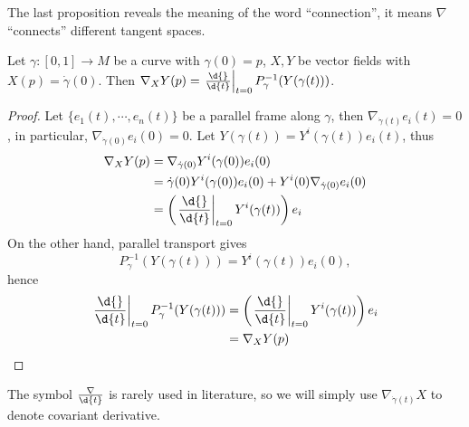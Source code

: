 The last proposition reveals the meaning of the word ``connection'', it means $\nabla$ ``connects'' different tangent spaces.
\begin{prop}
    Let $\gamma:[0,1]\to M$ be a curve with $\gamma(0)=p$, $X,Y$ be vector fields with $X(p)=\dot{\gamma}(0)$.
    Then $\nabla_XY(p)=\left.\frac{\d{}}{\d{t}}\right|_{t=0}P^{-1}_\gamma(Y(\gamma(t)))$.
\end{prop}
\begin{proof}
    Let $\{e_1(t),\cdots,e_n(t)\}$ be a parallel frame along $\gamma$, then $\nabla_{\dot{\gamma}(t)}e_i(t)=0$, in particular, $\nabla_{\dot{\gamma}(0)}e_i(0)=0$.
    Let $Y(\gamma(t))=Y^i(\gamma(t))e_i(t)$, thus
    \begin{align*}
        \nabla_XY(p)&=\nabla_{\dot{\gamma}(0)}Y^i(\gamma(0))e_i(0)\\
        &=\dot{\gamma}(0)Y^i(\gamma(0))e_i(0)+Y^i(0)\nabla_{\dot{\gamma}(0)}e_i(0)\\
        &=\left(\left.\frac{\d{}}{\d{t}}\right|_{t=0}Y^i(\gamma(t))\right)e_i
    \end{align*}
    On the other hand, parallel transport gives
    \[P^{-1}_{\gamma}(Y(\gamma(t)))=Y^i(\gamma(t))e_i(0),\]
    hence
    \begin{align*}
        \left.\frac{\d{}}{\d{t}}\right|_{t=0}P^{-1}_\gamma(Y(\gamma(t)))&=\left(\left.\frac{\d{}}{\d{t}}\right|_{t=0}Y^i(\gamma(t))\right)e_i\\
        &=\nabla_XY(p)\qedhere
    \end{align*}
\end{proof}

\begin{rem}
    The symbol $\frac{\nabla}{\d{t}}$ is rarely used in literature, so we will simply use $\nabla_{\dot{\gamma}(t)}X$ to denote covariant derivative.
\end{rem}